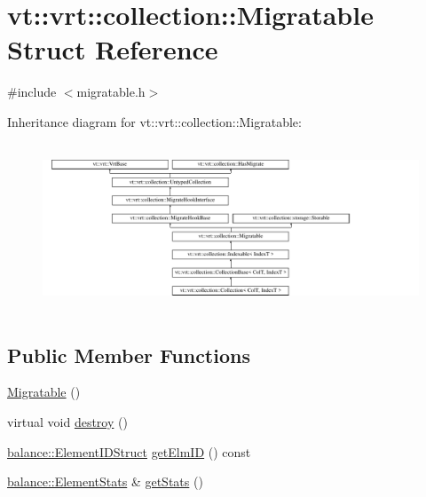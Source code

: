 \hypertarget{structvt_1_1vrt_1_1collection_1_1_migratable}{}\section{vt\+:\+:vrt\+:\+:collection\+:\+:Migratable Struct Reference}
\label{structvt_1_1vrt_1_1collection_1_1_migratable}


{\ttfamily \#include $<$migratable.\+h$>$}

Inheritance diagram for vt\+:\+:vrt\+:\+:collection\+:\+:Migratable\+:\begin{figure}[H]
\begin{center}
\leavevmode
\includegraphics[height=5.028059cm]{structvt_1_1vrt_1_1collection_1_1_migratable}
\end{center}
\end{figure}
\subsection*{Public Member Functions}
\begin{DoxyCompactItemize}
\item 
\hyperlink{structvt_1_1vrt_1_1collection_1_1_migratable_a598f0bb3acfb602d437eab3625b105c5}{Migratable} ()
\item 
virtual void \hyperlink{structvt_1_1vrt_1_1collection_1_1_migratable_a31effa8f54013d1a1794cd025c24e410}{destroy} ()
\item 
\hyperlink{structvt_1_1vrt_1_1collection_1_1balance_1_1_element_i_d_struct}{balance\+::\+Element\+I\+D\+Struct} \hyperlink{structvt_1_1vrt_1_1collection_1_1_migratable_a1b074bbe076e5eb0f83141e4b4504afe}{get\+Elm\+ID} () const
\item 
\hyperlink{structvt_1_1vrt_1_1collection_1_1balance_1_1_element_stats}{balance\+::\+Element\+Stats} \& \hyperlink{structvt_1_1vrt_1_1collection_1_1_migratable_a1e4863b384ac80b0b7c0b147c68256df}{get\+Stats} ()
\end{DoxyCompactItemize}
